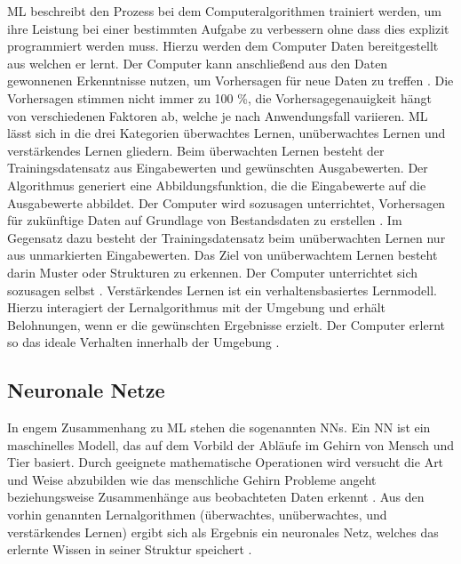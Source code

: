 \ac{ML} beschreibt den Prozess bei dem Computeralgorithmen trainiert werden, um ihre Leistung bei einer bestimmten Aufgabe zu verbessern ohne dass dies explizit programmiert werden muss.
Hierzu werden dem Computer Daten bereitgestellt aus welchen er lernt.
Der Computer kann anschließend aus den Daten gewonnenen Erkenntnisse nutzen, um Vorhersagen für neue Daten zu treffen \autocite[vgl.][S. 4]{judith_hurwitz_machine_2018}.
Die Vorhersagen stimmen nicht immer zu 100 \%, die Vorhersagegenauigkeit hängt von verschiedenen Faktoren ab, welche je nach Anwendungsfall variieren.
\newline
\ac{ML} lässt sich in die drei Kategorien überwachtes Lernen, unüberwachtes Lernen und verstärkendes Lernen gliedern.
Beim überwachten Lernen besteht der Trainingsdatensatz aus Eingabewerten und gewünschten Ausgabewerten.
Der Algorithmus generiert eine Abbildungsfunktion, die die Eingabewerte auf die Ausgabewerte abbildet.
Der Computer wird sozusagen unterrichtet, Vorhersagen für zukünftige Daten auf Grundlage von Bestandsdaten zu erstellen \autocite[vgl][S. 11]{thakkar_beginning_2019}.
Im Gegensatz dazu besteht der Trainingsdatensatz beim unüberwachten Lernen nur aus unmarkierten Eingabewerten.
Das Ziel von unüberwachtem Lernen besteht darin Muster oder Strukturen zu erkennen.
Der Computer unterrichtet sich sozusagen selbst \autocites[vgl.][S. 11-12]{thakkar_beginning_2019}[vgl.][S. 6]{etaati_machine_2019}.
Verstärkendes Lernen ist ein verhaltensbasiertes Lernmodell.
Hierzu interagiert der Lernalgorithmus mit der Umgebung und erhält Belohnungen, wenn er die gewünschten Ergebnisse erzielt. 
Der Computer erlernt so das ideale Verhalten innerhalb der Umgebung \autocite[vgl][S. 12]{thakkar_beginning_2019}.

\subsection{Neuronale Netze}
In engem Zusammenhang zu \acl{ML} stehen die sogenannten \aclp{NN}.
Ein \ac{NN} ist ein maschinelles Modell, das auf dem Vorbild der Abläufe im Gehirn von Mensch und Tier basiert.
Durch geeignete mathematische Operationen wird versucht die Art und Weise abzubilden wie das menschliche Gehirn Probleme angeht beziehungsweise Zusammenhänge aus beobachteten Daten erkennt \autocites[vgl.][S. 604]{backhaus_multivariate_2016}[vgl.][S. 31]{judith_hurwitz_machine_2018}.
Aus den vorhin genannten Lernalgorithmen (überwachtes, unüberwachtes, und verstärkendes Lernen) ergibt sich als Ergebnis ein neuronales Netz, welches das erlernte Wissen in seiner Struktur speichert \autocite[vgl.][S. 427]{guresen_definition_2011}.

